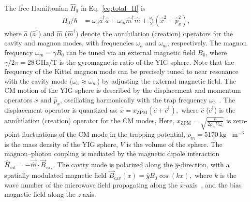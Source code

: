 \documentclass[aps, prresearch, reprint, nofootinbib, longbibliography]{revtex4-2}
\begin{document}
The free Hamiltonian $\hat{H}_0$ in Eq.~\eqref{eq:total_H} is 
\begin{align}
\hat{H}_0/\hbar &= \omega_a \hat{a}^\dagger \hat{a} + \omega_m \hat{m}^\dagger \hat{m} + \frac{\omega_c}{2} \left( \hat{x}^2 + \hat{p}_x^2 \right), \label{eq:H0}
\end{align}
where $\hat{a}$ ($\hat{a}^\dagger$) and $\hat{m}$ ($\hat{m}^\dagger$) denote the annihilation (creation) operators for the cavity and magnon modes, with frequencies $\omega_a$ and $\omega_m$, respectively.
The magnon frequency $\omega_m = \gamma B_0$ can be tuned via an external magnetic field $B_0$, where $\gamma/2\pi= 28 \, \mathrm{GHz/T}$ is the gyromagnetic ratio of the YIG sphere.
Note that the frequency of the Kittel magnon mode can be precisely tuned to near resonance with the cavity mode ($\omega_a \approx \omega_m$) by adjusting the external magnetic field.
The CM motion of the YIG sphere is described by the displacement and momentum operators $\hat{x}$ and $\hat{p}_x$, oscillating harmonically with the trap frequency $\omega_c$~\cite{PhysRevA.110.013710,prr, PhysRevLett128013602}. The displacement
operator is quantized as:
$	\hat{x} = x_{\scriptscriptstyle\text{ZPM}}(\hat{c} + \hat{c}^\dagger), $
where $\hat{c}$ ($\hat{c}^\dagger$) is the annihilation (creation) operator for the CM modes, %
Here, $x_{\scriptscriptstyle\text{ZPM}} = \sqrt{\frac{\hbar}{2{\rho_m}V\omega_{c}}}$ is zero-point fluctuations of the CM mode in the trapping potential,
$\rho_m = 5170\ \text{kg}\ \cdot\text{m}^{-3}$ is the mass density of the YIG sphere, $V$ is the volume of the sphere.
The magnon--photon coupling is mediated by the magnetic dipole interaction
$
\hat{H}_{\text{int}} = -\vec{\hat{m}} \cdot \vec{B}_{\text{cav}}. \label{eq:magnetic_dipole}
$
The cavity mode is polarized along the $\hat{y}$-direction, with a spatially modulated magnetic field
$
\vec{B}_{\text{cav}}(x) = \hat{y} B_0 \cos(kx), \label{eq:B_cav}
$
where $k$ is the wave number of the microwave field propagating along the $\hat{x}$-axis~\cite{PhysRevLett128013602}, and the bias magnetic field along the \textit{z}-axis. 
\end{document}
